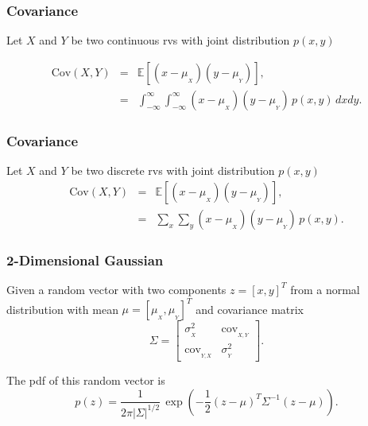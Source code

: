 \begin{frame}[fragile]\frametitle{Covariance}

\begin{defn}
Let $X$ and $Y$ be two continuous rvs with joint distribution
$p(x,y)$ 

\begin{eqnarray*}
\mbox{Cov}(X,Y)& =& \mathbb E[(x-\mu_{_X})(y-\mu_{_Y})],\\
& = & \int_{-\infty}^{\infty}  \int_{-\infty}^{\infty} 
(x-\mu_{_X})(y-\mu_{_Y}) \, p(x,y)  \, dx dy.
\end{eqnarray*}

\end{defn}
\end{frame}

\begin{frame}[fragile]\frametitle{Covariance}

\begin{defn}
Let $X$ and $Y$ be two discrete rvs with joint distribution
$p(x,y)$ 
\begin{eqnarray*}
\mbox{Cov}(X,Y)& =& \mathbb E[(x-\mu_{_X})(y-\mu_{_Y})],\\
& = & \sum_x \sum_y  (x-\mu_{_X})(y-\mu_{_Y}) \, p(x,y).
\end{eqnarray*}


\end{defn}

\end{frame}

\begin{frame}[fragile]\frametitle{2-Dimensional Gaussian}

\begin{defn}
Given a random vector with two components $z = [x, y ]^T$
from a normal distribution with mean $\mu = [\mu_{_X}, \mu_{_Y}]^T$
and covariance matrix 
$$\Sigma=\begin{bmatrix} \sigma_{_X}^2 & \mbox{cov}_{_{X,Y}} \\
\mbox{cov}_{_{Y,X}} & \sigma_{_Y}^2 \end{bmatrix}.$$ 

The pdf of this random vector is
$$p(z) = \frac{1}{2 \pi |\Sigma|^{1/2}} \, \exp\left(-\frac{1}{2}
(z-\mu)^T \Sigma^{-1} (z-\mu)\right).$$ 
\end{defn}

\end{frame}

